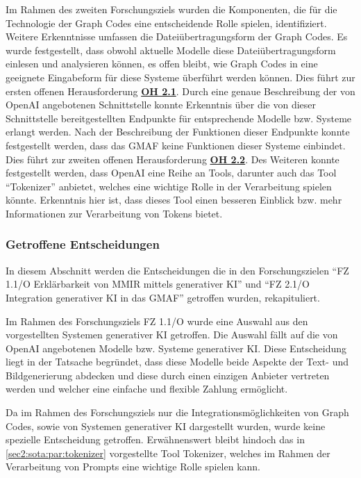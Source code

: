 Im Rahmen des zweiten Forschungsziels wurden die Komponenten, die für die Technologie der Graph Codes eine entscheidende Rolle spielen, identifiziert.
Weitere Erkenntnisse umfassen die Dateiübertragungsform der Graph Codes.
Es wurde festgestellt, dass obwohl aktuelle Modelle diese Dateiübertragungsform einlesen und analysieren können, es offen bleibt, wie Graph Codes in eine geeignete Eingabeform für diese Systeme überführt werden können.
Dies führt zur ersten offenen Herausforderung \hyperref[sec2:sota:oi:2.1]{\textbf{OH 2.1}}.
Durch eine genaue Beschreibung der von OpenAI angebotenen Schnittstelle konnte Erkenntnis über die von dieser Schnittstelle bereitgestellten Endpunkte für entsprechende Modelle bzw. Systeme erlangt werden.
Nach der Beschreibung der Funktionen dieser Endpunkte konnte festgestellt werden, dass das GMAF keine Funktionen dieser Systeme einbindet.
Dies führt zur zweiten offenen Herausforderung \hyperref[sec2:sota:oi:2.2]{\textbf{OH 2.2}}.
Des Weiteren konnte festgestellt werden, dass OpenAI eine Reihe an Tools, darunter auch das Tool \enquote{Tokenizer} anbietet, welches eine wichtige Rolle in der Verarbeitung spielen könnte.
Erkenntnis hier ist, dass dieses Tool einen besseren Einblick bzw. mehr Informationen zur Verarbeitung von Tokens bietet.

\subsubsection{Getroffene Entscheidungen}
\label{sec2:sota:subsubsec:summary-decisions}
In diesem Abschnitt werden die Entscheidungen die in den Forschungszielen \enquote{FZ 1.1/O Erklärbarkeit von MMIR mittels generativer KI} und \enquote{FZ 2.1/O Integration generativer KI in das GMAF} getroffen wurden, rekapituliert.

Im Rahmen des Forschungsziels FZ 1.1/O wurde eine Auswahl aus den vorgestellten Systemen generativer KI getroffen.
Die Auswahl fällt auf die von OpenAI angebotenen Modelle bzw. Systeme generativer KI.
Diese Entscheidung liegt in der Tatsache begründet, dass diese Modelle beide Aspekte der Text- und Bildgenerierung abdecken und diese durch einen einzigen Anbieter vertreten werden und welcher eine einfache und flexible Zahlung ermöglicht.

Da im Rahmen des Forschungsziels nur die Integrationsmöglichkeiten von Graph Codes, sowie von Systemen generativer KI dargestellt wurden, wurde keine spezielle Entscheidung getroffen.
Erwähnenswert bleibt hindoch das in \cref{sec2:sota:par:tokenizer} vorgestellte Tool Tokenizer, welches im Rahmen der Verarbeitung von Prompts eine wichtige Rolle spielen kann.


